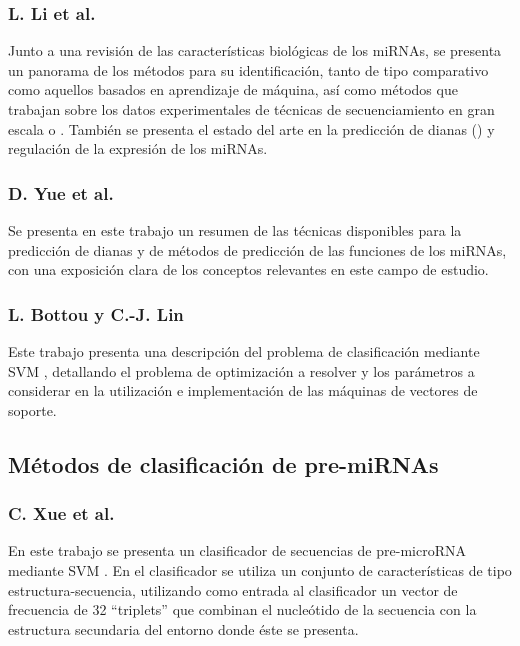 \documentclass[12pt,bibliography=oldstyle,DIV=12,parskip=half-,titlepage]{scrartcl}
\begin{document}
\subsubsection*{L. Li et al. \cite{lili}}
Junto a una revisión de las características biológicas de los miRNAs,
se presenta un panorama de los métodos para su identificación, tanto
de tipo comparativo como aquellos basados en aprendizaje de máquina,
así como métodos que trabajan sobre los datos experimentales de
técnicas de secuenciamiento en gran escala o .
También se presenta el estado del arte en la predicción de dianas
() y regulación de la expresión de los miRNAs.
%
\subsubsection*{D. Yue et al. \cite{yue}}
Se presenta en este trabajo un resumen de las técnicas disponibles
para la predicción de dianas y de métodos de predicción de las
funciones de los miRNAs, con una exposición clara de los conceptos
relevantes en este campo de estudio.
%
\subsubsection*{L. Bottou y C.-J. Lin \cite{bottou}}
Este trabajo presenta una descripción del problema de clasificación
mediante SVM \cite{svm}, detallando el problema de optimización a
resolver y los parámetros a considerar en la utilización e
implementación de las máquinas de vectores de soporte.
%
%
\subsection{Métodos de clasificación de pre-miRNAs}
\subsubsection*{C. Xue et al. \cite{xue}}
%
En este trabajo se presenta un clasificador de secuencias de
pre-microRNA mediante SVM \cite{svm}.  En el clasificador se utiliza
un conjunto de características de tipo estructura-secuencia,
utilizando como entrada al clasificador un vector de frecuencia de 32
``triplets'' que combinan el nucleótido de la secuencia con la
estructura secundaria del entorno donde éste se presenta.
%
\end{document}
